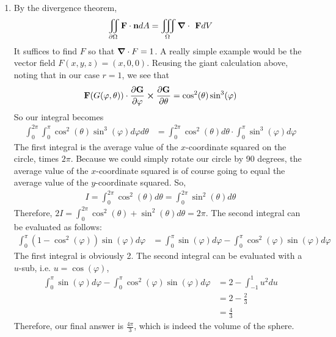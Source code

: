 \documentclass[12pt]{article}
\theoremstyle{definition}
\theoremstyle{remark}
\newcommand{\cph}{\varphi}
\begin{document}
\begin{enumerate}[leftmargin=\labelsep]
		\item By the divergence theorem,
		\begin{align*}
			\iint_{\partial \Omega} \textbf{F} \cdot \textbf{n} dA = \iiint_{\Omega} \grad \cdot \textbf{ F} dV
		\end{align*}
		It suffices to find $F$ so that $\grad \cdot F = 1$. A really simple example would be the vector field $F(x, y, z) = (x, 0, 0)$. Reusing the giant calculation above, noting that in our case $r = 1$, we see that 
		\begin{align*}
			\textbf{F}(G(\cph, \theta)) \cdot \pdv{\textbf{G}}{\cph} \cross \pdv{\textbf{G}}{\theta} = \cos^2(\theta)\sin^3(\cph)
		\end{align*}
		So our integral becomes
		\begin{align*}
			\int_0^{2\pi} \int_0^{\pi} \cos^2(\theta)\sin^3(\cph)d\cph d\theta &= \int_0^{2\pi} \cos^2(\theta)d\theta \cdot \int_0^\pi \sin^3(\cph)d\cph
		\end{align*}
		The first integral is the average value of the $x$-coordinate squared on the circle, times $2\pi$. Because we could simply rotate our circle by 90 degrees, the average value of the $x$-coordinate squared is of course going to equal the average value of the $y$-coordinate squared. So, 
		\begin{align*}
			I = \int_0^{2\pi} \cos^2(\theta)d\theta = \int_0^{2\pi} \sin^2(\theta)d\theta
		\end{align*}
		Therefore, $2I = \int_0^{2\pi} \cos^2(\theta)+\sin^2(\theta)d\theta = 2\pi$.
		The second integral can be evaluated as follows:
		\begin{align*}
			\int_0^\pi (1-\cos^2(\cph))\sin(\cph)d\cph &= \int_0^\pi \sin(\cph)d\cph - \int_0^\pi \cos^2(\cph)\sin(\cph)d\cph
		\end{align*}
		The first integral is obviously 2. The second integral can be evaluated with a $u$-sub, i.e. $u = \cos(\cph)$,
		\begin{align*}
			\int_0^\pi \sin(\cph)d\cph - \int_0^\pi \cos^2(\cph)\sin(\cph)d\cph &= 2 - \int_{-1}^1 u^2du \\
			&= 2 - \frac23 \\
			&= \frac43
		\end{align*}
		Therefore, our final answer is $\frac{4\pi}3$, which is indeed the volume of the sphere.
		

\end{enumerate}
\end{document}
